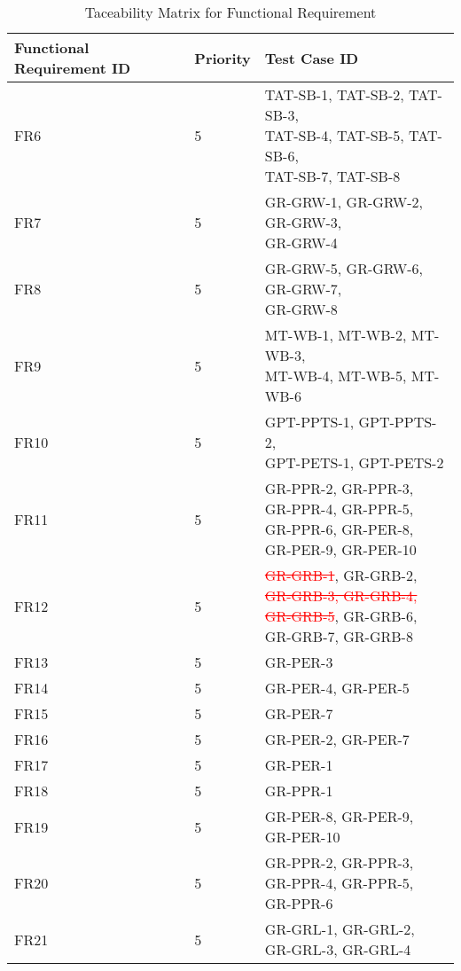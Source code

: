 \documentclass[12pt, titlepage]{article}
\begin{document}
\begin{table}[h]
\begin{tabular}{|p{3cm}|p{3cm}|p{7cm}|}
 \hline
 Functional Requirement ID & Priority & Test Case ID\\
 
 
  \hline
 FR6 & 5 & \makecell[l]{TAT-SB-1, TAT-SB-2, TAT-SB-3,\\ TAT-SB-4, TAT-SB-5, TAT-SB-6,\\ TAT-SB-7, TAT-SB-8}\\
  \hline
 FR7 & 5 & \makecell[l]{GR-GRW-1, GR-GRW-2, GR-GRW-3,\\ GR-GRW-4}\\
  \hline
  FR8 & 5 & \makecell[l]{GR-GRW-5, GR-GRW-6, GR-GRW-7,\\ GR-GRW-8}\\
 \hline
 FR9 & 5 & \makecell[l]{MT-WB-1, MT-WB-2, MT-WB-3,\\MT-WB-4, MT-WB-5, MT-WB-6}\\
  \hline
 FR10 & 5 & \makecell[l]{GPT-PPTS-1, GPT-PPTS-2,\\ GPT-PETS-1, GPT-PETS-2}\\
  \hline
 FR11 & 5 & \makecell[l]{GR-PPR-2, GR-PPR-3, \\GR-PPR-4, GR-PPR-5, \\GR-PPR-6, GR-PER-8, \\GR-PER-9, GR-PER-10}\\
  \hline
 FR12 & 5 & \makecell[l]{\textcolor{red}{\sout{GR-GRB-1}}, GR-GRB-2, \\\textcolor{red}{\sout{GR-GRB-3, GR-GRB-4,}} \\\textcolor{red}{\sout{GR-GRB-5}}, GR-GRB-6, \\GR-GRB-7, GR-GRB-8}\\
  \hline
 FR13 & 5 & GR-PER-3\\
  \hline
 FR14 & 5 & GR-PER-4, GR-PER-5\\
  \hline
 FR15 & 5 & GR-PER-7\\
  \hline
 FR16 & 5 & GR-PER-2, GR-PER-7\\
  \hline
 FR17 & 5 & GR-PER-1\\
  \hline
 FR18 & 5 & GR-PPR-1\\
  \hline
 FR19 & 5 & \makecell[l]{GR-PER-8, GR-PER-9, \\GR-PER-10}\\
  \hline
 FR20 & 5 & \makecell[l]{GR-PPR-2, GR-PPR-3, \\GR-PPR-4, GR-PPR-5, \\GR-PPR-6}\\
  \hline
 FR21 & 5 & \makecell[l]{GR-GRL-1, GR-GRL-2, \\GR-GRL-3, GR-GRL-4}\\
  \hline
\end{tabular}
\caption{Taceability Matrix for Functional Requirement}
\label{table: Taceability Matrix for Functional Requirement}
\end{table}
\end{document}
